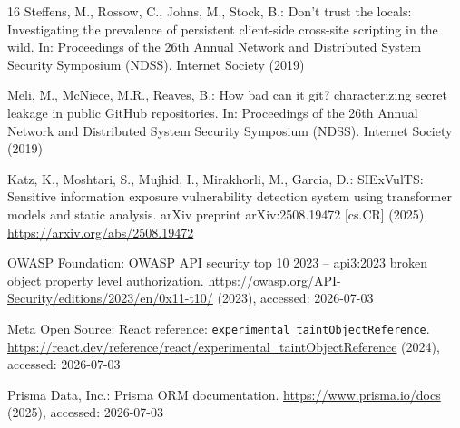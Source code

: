 \documentclass[runningheads]{llncs}
\begin{document}
\begin{thebibliography}{16}
Steffens, M., Rossow, C., Johns, M., Stock, B.: Don't trust the locals:
  Investigating the prevalence of persistent client-side cross-site scripting
  in the wild. In: Proceedings of the 26th Annual Network and Distributed
  System Security Symposium (NDSS). Internet Society (2019)

Meli, M., McNiece, M.R., Reaves, B.: How bad can it git? characterizing secret
  leakage in public {GitHub} repositories. In: Proceedings of the 26th Annual
  Network and Distributed System Security Symposium (NDSS). Internet Society
  (2019)

Katz, K., Moshtari, S., Mujhid, I., Mirakhorli, M., Garcia, D.: {SIExVulTS}:
  Sensitive information exposure vulnerability detection system using
  transformer models and static analysis. arXiv preprint arXiv:2508.19472
  [cs.CR] (2025), \url{https://arxiv.org/abs/2508.19472}

{OWASP Foundation}: {OWASP} {API} security top 10 2023 -- api3:2023 broken
  object property level authorization.
  \url{https://owasp.org/API-Security/editions/2023/en/0x11-t10/} (2023),
  accessed: 2026-07-03

{Meta Open Source}: {React} reference:
  \texttt{experimental\_taintObjectReference}.
  \url{https://react.dev/reference/react/experimental_taintObjectReference}
  (2024), accessed: 2026-07-03

{Prisma Data, Inc.}: Prisma {ORM} documentation.
  \url{https://www.prisma.io/docs} (2025), accessed: 2026-07-03

\end{thebibliography}
\end{document}
